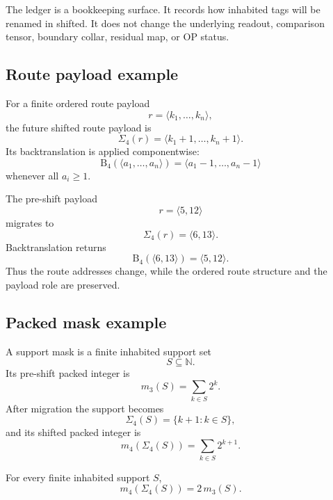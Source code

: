 \begin{remark}
\label{rem:v3371-ledger-not-new-theorem}
The ledger is a bookkeeping surface. It records how inhabited tags will be
renamed in shifted. It does not change the underlying readout, comparison tensor,
boundary collar, residual map, or OP status.
\end{remark}

\subsection{Route payload example}
\label{subsec:v3371-route-payload-example}

\begin{definition}
\label{def:v3371-route-payload-migration}
For a finite ordered route payload
\[
 r=\langle k_1,\ldots,k_n\rangle,
\]
the future shifted route payload is
\[
 \Sigma_4(r)
 =
 \langle k_1+1,\ldots,k_n+1\rangle.
\]
Its backtranslation is applied componentwise:
\[
 \mathrm B_4(\langle a_1,\ldots,a_n\rangle)
 =
 \langle a_1-1,\ldots,a_n-1\rangle
\]
whenever all $a_i\geq 1$.
\end{definition}

\begin{remark}
\label{rem:v3371-two-entry-route-payload-example}
The pre-shift payload
\[
 r=\langle 5,12\rangle
\]
migrates to
\[
 \Sigma_4(r)=\langle 6,13\rangle.
\]
Backtranslation returns
\[
 \mathrm B_4(\langle 6,13\rangle)=\langle 5,12\rangle.
\]
Thus the route addresses change, while the ordered route structure and the
payload role are preserved.
\end{remark}

\subsection{Packed mask example}
\label{subsec:v3371-packed-mask-example}

\begin{definition}
\label{def:v3371-support-mask-versus-packed-mask}
A support mask is a finite inhabited support set
\[
 S\subseteq \mathbb N.
\]
Its pre-shift packed integer is
\[
 m_3(S)=\sum_{k\in S}2^k.
\]
After migration the support becomes
\[
 \Sigma_4(S)=\{k+1:k\in S\},
\]
and its shifted packed integer is
\[
 m_4(\Sigma_4(S))=\sum_{k\in S}2^{k+1}.
\]
\end{definition}

\begin{lemma}
\label{lem:v3371-packed-mask-doubling-rule}
For every finite inhabited support $S$,
\[
 m_4(\Sigma_4(S))=2\,m_3(S).
\]
\end{lemma}

